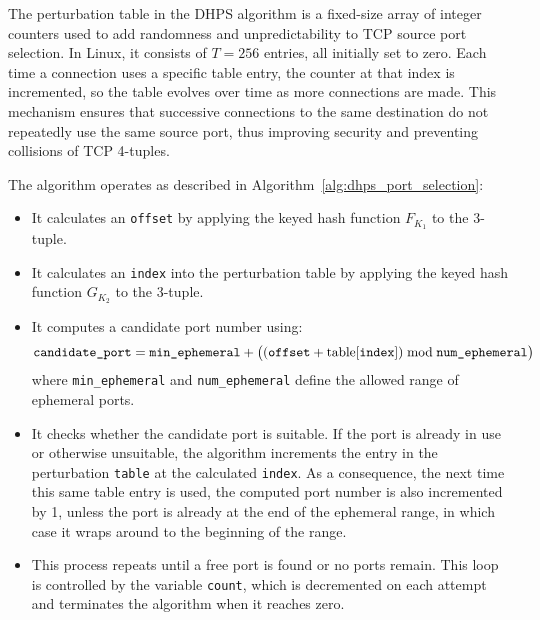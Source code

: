 \documentclass{report}
\begin{document}
The \alert{perturbation table} in the DHPS algorithm is a fixed-size array of integer counters used to add randomness and unpredictability to TCP source port selection. In Linux, it consists of $T = 256$ entries, all initially set to zero. Each time a connection uses a specific table entry, the counter at that index is incremented, so the table evolves over time as more connections are made. This mechanism ensures that successive connections to the same destination do not repeatedly use the same source port, thus improving security and preventing collisions of TCP 4-tuples.



The algorithm operates as described in Algorithm~\ref{alg:dhps_port_selection}:
\begin{itemize}
	\item It calculates an \texttt{offset} by applying the keyed hash function \( F_{K_1} \) to the 3-tuple.
	\item It calculates an \texttt{index} into the perturbation table by applying the keyed hash function \( G_{K_2} \) to the 3-tuple.
	\item It computes a candidate port number using:
	\[
		\texttt{candidate\_port} = \texttt{min\_ephemeral} + \bigl((\texttt{offset} + \text{table[\texttt{index}]}) \bmod \texttt{num\_ephemeral}\bigr)
	\]
	where \texttt{min\_ephemeral} and \texttt{num\_ephemeral} define the allowed range of ephemeral ports.
	\item It checks whether the candidate port is suitable. If the port is already in use or otherwise unsuitable, the algorithm increments the entry in the perturbation \texttt{table} at the calculated \texttt{index}. As a consequence, the next time this same table entry is used, the computed port number is also incremented by 1, unless the port is already at the end of the ephemeral range, in which case it wraps around to the beginning of the range.
	\item This process repeats until a free port is found or no ports remain. This loop is controlled by the variable \texttt{count}, which is decremented on each attempt and terminates the algorithm when it reaches zero.
\end{itemize}
\end{document}
